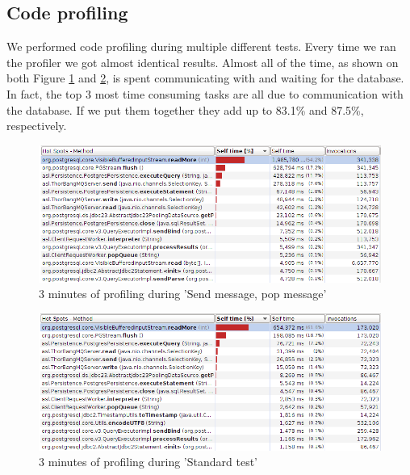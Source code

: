 \documentclass{article}
\begin{document}
        \subsection{Code profiling}
            We performed code profiling during multiple different tests. Every time we ran the profiler we got almost identical results. Almost all of the time, as shown on both Figure \ref{fig:code_profiling_send_pop_same_client} and \ref{fig:code_profiling_standard_test}, is spent communicating with and waiting for the database. In fact, the top 3 most time consuming tasks are all due to communication with the database. If we put them together they add up to 83.1\% and 87.5\%, respectively.
            \begin{figure}[H]
                \hspace{-1.5cm}
                \includegraphics[scale=0.50]{code_profiling_send_pop_same_client}
                \caption{3 minutes of profiling during 'Send message, pop message'}
                \label{fig:code_profiling_send_pop_same_client}
            \end{figure}
            \begin{figure}[H]
                \hspace{-1.5cm}
                \includegraphics[scale=0.50]{code_profiling_standard_test}
                \caption{3 minutes of profiling during 'Standard test'}
                \label{fig:code_profiling_standard_test}
            \end{figure}
\end{document}
